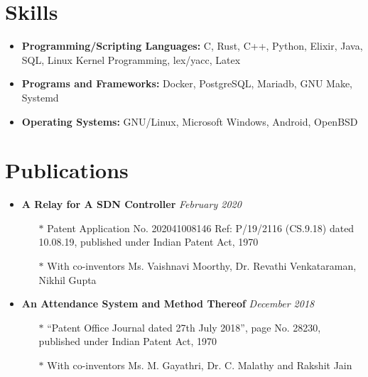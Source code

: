 \documentclass[10pt,a4paper]{article}
\begin{document}
\section{{\faCogs} Skills}
	\begin{itemize}[noitemsep,nolistsep]
		\item{\textbf{Programming/Scripting Languages:} C, Rust, C++, Python, Elixir, Java, SQL, Linux Kernel Programming, lex/yacc, Latex}
		\item{\textbf{Programs and Frameworks:} Docker, PostgreSQL, Mariadb, GNU Make, Systemd}
		\item{\textbf{Operating Systems:} GNU/Linux, Microsoft Windows, Android, OpenBSD}
	\end{itemize}


\section{{\faNewspaperO} Publications}
	\begin{itemize}[noitemsep,nolistsep]
		\item{\textbf{A Relay for A SDN Controller}} \hfill \textit{February 2020}
			\begin{itemize}[leftmargin=*]
				\setlength\itemsep{-0.25em}
				\item[$\ast$]{Patent Application No. 202041008146 Ref: P/19/2116 (CS.9.18) dated 10.08.19, published under Indian Patent Act, 1970}
				\item[$\ast$]{With co-inventors Ms. Vaishnavi Moorthy, Dr. Revathi Venkataraman, Nikhil Gupta}
			\end{itemize}
		\item{\textbf{An Attendance System and Method Thereof}} \hfill \textit{December 2018}
			\begin{itemize}[leftmargin=*]
				\setlength\itemsep{-0.25em}
				\item[$\ast$]{``Patent Office Journal dated 27th July 2018'', page No. 28230, published under Indian Patent Act, 1970}
				\item[$\ast$]{With co-inventors Ms. M. Gayathri, Dr. C. Malathy and Rakshit Jain}
			\end{itemize}
	\end{itemize}
\end{document}
